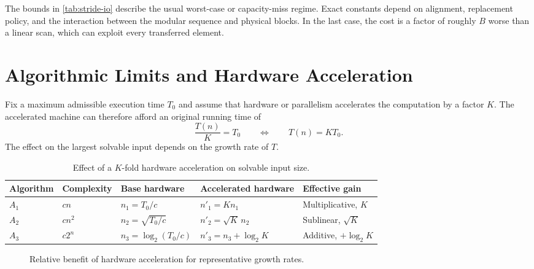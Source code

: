 The bounds in \autoref{tab:stride-io} describe the usual worst-case or
capacity-miss regime. Exact constants depend on alignment, replacement policy,
and the interaction between the modular sequence and physical blocks. In the
last case, the cost is a factor of roughly $B$ worse than a linear scan, which
can exploit every transferred element.

\section{Algorithmic Limits and Hardware Acceleration}
\label{sec:scaling-laws}

Fix a maximum admissible execution time $T_0$ and assume that hardware or
parallelism accelerates the computation by a factor $K$. The accelerated
machine can therefore afford an original running time of
\[
  \frac{T(n)}{K}=T_0
  \qquad\Longleftrightarrow\qquad
  T(n)=K T_0.
\]
The effect on the largest solvable input depends on the growth rate of $T$.

\begin{table}[H]
  \centering
  \small
  \caption{Effect of a $K$-fold hardware acceleration on solvable input size.}
  \label{tab:scaling-laws}
  \begin{tabularx}{\textwidth}{@{}p{}p{}YY>{\raggedright\arraybackslash}p{0.18\textwidth}@{}}
    \toprule
    Algorithm & Complexity & Base hardware & Accelerated hardware & Effective gain \\
    \midrule
    $A_1$ & $c n$ & $n_1=T_0/c$ & $n'_1=K n_1$ & Multiplicative, $K$ \\
    $A_2$ & $c n^2$ & $n_2=\sqrt{T_0/c}$ & $n'_2=\sqrt{K}\,n_2$ & Sublinear, $\sqrt K$ \\
    $A_3$ & $c2^n$ & $n_3=\log_2(T_0/c)$ & $n'_3=n_3+\log_2 K$ & Additive, $+\log_2 K$ \\
    \bottomrule
  \end{tabularx}
\end{table}

\begin{figure}[H]
  \centering
  \caption{Relative benefit of hardware acceleration for representative growth rates.}
  \label{fig:scaling-laws}
\end{figure}

